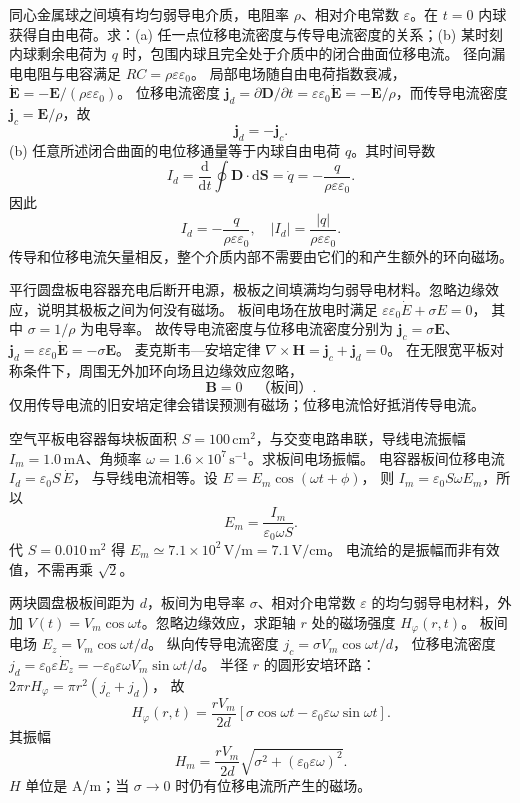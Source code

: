 同心金属球之间填有均匀弱导电介质，电阻率 $\rho$、相对介电常数 $\varepsilon$。在 $t=0$ 内球获得自由电荷。求：(a) 任一点位移电流密度与传导电流密度的关系；(b) 某时刻内球剩余电荷为 $q$ 时，包围内球且完全处于介质中的闭合曲面位移电流。
\exsolution
径向漏电电阻与电容满足
$RC=\rho\varepsilon\varepsilon_0$。
局部电场随自由电荷指数衰减，
$\dot{\bm E}=-\bm E/(\rho\varepsilon\varepsilon_0)$。
位移电流密度
$\bm j_d=\partial\bm D/\partial t
=\varepsilon\varepsilon_0\dot{\bm E}
=-\bm E/\rho$，而传导电流密度
$\bm j_c=\bm E/\rho$，故
\[
\boxed{\bm j_d=-\bm j_c}.
\]
(b) 任意所述闭合曲面的电位移通量等于内球自由电荷 $q$。其时间导数
\[
I_d=\frac{\mathrm d}{\mathrm dt}\oint\bm D\cdot\mathrm d\bm S
=\dot q=-\frac q{\rho\varepsilon\varepsilon_0}.
\]
因此
\[
\boxed{I_d=-\frac q{\rho\varepsilon\varepsilon_0}},
\quad |I_d|=\frac{|q|}{\rho\varepsilon\varepsilon_0}.
\]
\excheck 传导和位移电流矢量相反，整个介质内部不需要由它们的和产生额外的环向磁场。

平行圆盘板电容器充电后断开电源，极板之间填满均匀弱导电材料。忽略边缘效应，说明其极板之间为何没有磁场。
\exsolution
板间电场在放电时满足
$\varepsilon\varepsilon_0\dot E+\sigma E=0$，
其中 $\sigma=1/\rho$ 为电导率。
故传导电流密度与位移电流密度分别为
$\bm j_c=\sigma\bm E$、
$\bm j_d=\varepsilon\varepsilon_0\dot{\bm E}
=-\sigma\bm E$。
麦克斯韦—安培定律
$\nabla\times\bm H=\bm j_c+\bm j_d=0$。
在无限宽平板对称条件下，周围无外加环向场且边缘效应忽略，
\[
\boxed{\bm B=0\quad\text{（板间）}}.
\]
\excheck 仅用传导电流的旧安培定律会错误预测有磁场；位移电流恰好抵消传导电流。

空气平板电容器每块板面积
$S=100\,\mathrm{cm^2}$，与交变电路串联，导线电流振幅 $I_m=1.0\,\mathrm{mA}$、角频率 $\omega=1.6\times10^7\,\mathrm{s^{-1}}$。求板间电场振幅。
\exsolution
电容器板间位移电流
$I_d=\varepsilon_0S\,\dot E$，
与导线电流相等。设
$E=E_m\cos(\omega t+\phi)$，
则
$I_m=\varepsilon_0S\omega E_m$，所以
\[
\boxed{E_m=\frac{I_m}{\varepsilon_0\omega S}}.
\]
代 $S=0.010\,\mathrm{m^2}$ 得
$\boxed{E_m\simeq7.1\times10^2\,\mathrm{V/m}
=7.1\,\mathrm{V/cm}}$。
\excheck 电流给的是振幅而非有效值，不需再乘 $\sqrt2$。

两块圆盘极板间距为 $d$，板间为电导率 $\sigma$、相对介电常数 $\varepsilon$ 的均匀弱导电材料，外加
$V(t)=V_m\cos\omega t$。忽略边缘效应，求距轴 $r$ 处的磁场强度 $H_\varphi(r,t)$。
\exsolution
板间电场
$E_z=V_m\cos\omega t/d$。
纵向传导电流密度
$j_c=\sigma V_m\cos\omega t/d$，
位移电流密度
$j_d=\varepsilon_0\varepsilon\dot E_z
=-\varepsilon_0\varepsilon\omega V_m\sin\omega t/d$。
半径 $r$ 的圆形安培环路：
$2\pi rH_\varphi=\pi r^2(j_c+j_d)$，
故
\[
\boxed{H_\varphi(r,t)=\frac{rV_m}{2d}
[\sigma\cos\omega t-
\varepsilon_0\varepsilon\omega\sin\omega t]}.
\]
其振幅
\[
\boxed{H_m=\frac{rV_m}{2d}
\sqrt{\sigma^2+(\varepsilon_0\varepsilon\omega)^2}}.
\]
\excheck $H$ 单位是 A/m；当 $\sigma\to0$ 时仍有位移电流所产生的磁场。

